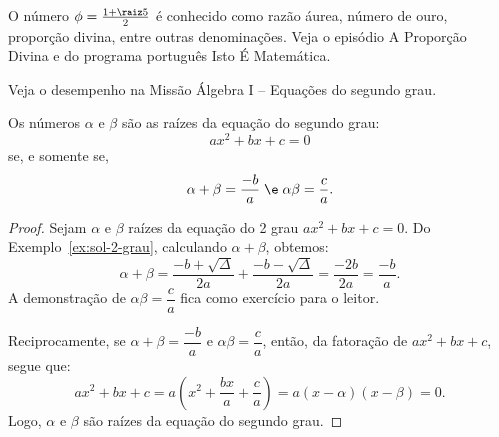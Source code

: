\begin{remark}
    O número $\phi = \frac {1 + \raiz 5} 2$ é conhecido como razão áurea, número de ouro, proporção divina, entre outras denominações.
    Veja o episódio A Proporção Divina  e  do programa português Isto É Matemática.
\end{remark}

\begin{onlineact}
    Veja o desempenho na Missão Álgebra I -- Equações do segundo grau.
\end{onlineact}

\begin{theorem}
    Os números $\alpha$ e $\beta$ são as raízes da equação do segundo grau:
    \[
        ax^2 + bx + c = 0
    \]
    se, e somente se,
    \[
        \alpha + \beta = \dfrac {-b} a \; \e \; \alpha \beta = \dfrac c a.
    \]
\end{theorem}

\begin{proof}
    Sejam $\alpha$ e $\beta$ raízes da equação do 2\tdeg{} grau $ax^2 + bx + c = 0$. Do Exemplo~\ref{ex:sol-2-grau}, calculando $\alpha+\beta$, obtemos:
    \[
        \alpha+\beta = \dfrac{-b+\sqrt\Delta}{2a}+\dfrac{-b-\sqrt\Delta}{2a} = \dfrac{-2b}{2a}=\dfrac{-b}{a}.
    \]
    A demonstração de $\alpha\beta = \dfrac c a$ fica como exercício para o leitor.

    Reciprocamente, se $\alpha+\beta = \dfrac {-b} a$ e $\alpha\beta = \dfrac c a$, então, da fatoração de $ax^2 + bx + c$, segue que:
    \[
        ax^2 + bx + c = a(x^2 + \frac {bx} a + \frac c a) = a(x - \alpha)(x - \beta) = 0.
    \]
    Logo, $\alpha$ e $\beta$ são raízes da equação do segundo grau.
\end{proof}